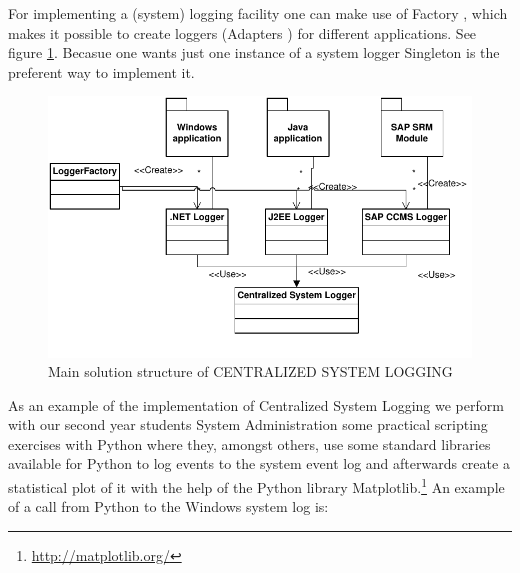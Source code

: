 For implementing a (system) logging facility one can make use of {\sc  Factory} \cite{Gamma95}, which makes it possible to create loggers ({\sc  Adapters} \cite{Gamma95}) for different applications. See figure \ref{fig:systemLogging}. Becasue one wants just one instance of a system logger {\sc  Singleton} \cite{Gamma95} is the preferent way to implement it.

\begin{figure}[h]
\centering
\includegraphics{patterns/systemLoggingDiagram.pdf}
\caption{Main solution structure of CENTRALIZED SYSTEM LOGGING}
\label{fig:systemLogging}
\end{figure}


\begin{center}
   
\end{center}

As an example of the implementation of {\sc Centralized System Logging} we perform with our second year students System Administration some practical scripting exercises with Python where they, amongst others, use some standard libraries available for Python to log events to the system event log and afterwards create a statistical plot of it with the help of the Python library Matplotlib.\footnote{\url{http://matplotlib.org/}} 
An example of a call from Python to the Windows system log is:

               
